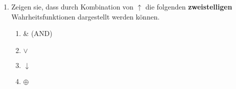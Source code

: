\documentclass[paper=a4,fontsize=11pt]{scrartcl}%
\numberwithin{equation}{section}
\newenvironment{solution}
	{
		\color{Blue}
		\textbf{Lösung:}
	}{}
\DeclareMathOperator{\id}{id}
\begin{document}
\begin{enumerate}
	\begin{solution}
	\begin{enumerate}
	\item $\neg$
	\begin{proof}
$\neg$ kann durch kombiniertes Anwenden von $\uparrow$ dargestellt werden\\
$\neg A \Leftrightarrow \neg (A +A) \Leftrightarrow A \uparrow A $ ,da $A + A \Leftrightarrow \id(A)$
\end{proof}
\item $id$

\begin{proof}
$\id$ kann durch kombiniertes Anwenden von $\uparrow$ dargestellt werden\\
$\id \Leftrightarrow \neg(\neg A) \Leftrightarrow A$ \\
aus a) folgt $\neg(A + A) \Leftrightarrow (A \uparrow A) \Leftrightarrow \neg A$ , daraus ergibt
$(A \uparrow A) \uparrow (A \uparrow A) \Leftrightarrow \neg(\neg(A)) \Leftrightarrow A$
\end{proof}
\item $\top$

\begin{proof}
$\top$ kann durch kombiniertes Anwenden von $\uparrow$ dargestellt werden\\
Wir verwenden einfach a) $\neg$ und c) $\top$
\end{proof}
\item $\bot$
\begin{proof}
$\bot$ kann durch kombiniertes Anwenden von $\uparrow$ dargestellt werden\\
Idee: Kontradiktion als Negation der Tautologie, die Tautologie wird mittels $\neg$ invertiert.\\
$ \Leftrightarrow \neg \top \Leftrightarrow \bot$  da die Kontradiktion die Inversion der Tautologie ist - also unsere Voraussetzung\\
$ \Leftrightarrow (\top \uparrow \top)$ die Negation aus a) und die Tautologie aus c)\\
$\bot = \top \uparrow \top = ((A \uparrow A) \uparrow A) \uparrow ((A \uparrow A) \uparrow A)$
\end{proof}
\end{enumerate}
	\end{solution}
	\item Zeigen sie, dass durch Kombination von $ \uparrow$ die folgenden \textbf{zweistelligen} Wahrheitsfunktionen dargestellt werden können.
	\begin{enumerate}
		\item \& (AND)
		\item $\lor$
		\item $\downarrow$
		\item $\oplus$
	\end{enumerate}
	

\end{enumerate}
\end{document}
